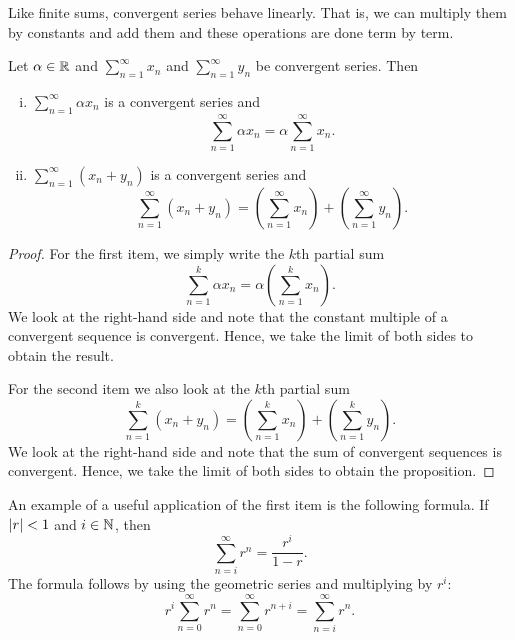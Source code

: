 Like finite sums, convergent series behave linearly.
That is, we can multiply them by constants
and add them and these operations are done term by term.

\begin{prop}
Let $\alpha \in {\mathbb{R}}$ and $\sum_{n=1}^\infty x_n$ and $\sum_{n=1}^\infty y_n$ be
convergent series.  Then
\begin{enumerate}[(i)]
\item
$\sum_{n=1}^\infty \alpha x_n$ is a convergent series and
\begin{equation*}
\sum_{n=1}^\infty \alpha x_n
=
\alpha \sum_{n=1}^\infty x_n .
\end{equation*}
\item
$\sum_{n=1}^\infty ( x_n + y_n )$ is a convergent series and
\begin{equation*}
\sum_{n=1}^\infty ( x_n + y_n ) 
=
\left( \sum_{n=1}^\infty x_n \right)
+
\left( \sum_{n=1}^\infty y_n \right) .
\end{equation*}
\end{enumerate}
\end{prop}

\begin{proof}
For the first item,
we simply write the $k$th partial sum
\begin{equation*}
\sum_{n=1}^k \alpha x_n
=
\alpha \left( \sum_{n=1}^k x_n \right) .
\end{equation*}
We look at the right-hand side and note that the constant multiple of
a convergent sequence
is convergent.  Hence, we take the limit of both sides to obtain
the result.

For the second item we also look at the
$k$th partial sum
\begin{equation*}
\sum_{n=1}^k ( x_n + y_n ) 
=
\left( \sum_{n=1}^k x_n \right)
+
\left( \sum_{n=1}^k y_n \right) .
\end{equation*}
We look at the right-hand side and note that the sum of convergent sequences
is convergent.  Hence, we take the limit of both sides to obtain
the proposition.
\end{proof}

An example of a useful application of the first item is the following
formula.  If $\left\lvert {r} \right\rvert < 1$ and $i \in {\mathbb{N}}$, then
\begin{equation*}
\sum_{n=i}^\infty r^n = \frac{r^i}{1-r} .
\end{equation*}
The formula follows by using the geometric series and multiplying by
$r^i$:
\begin{equation*}
r^i \sum_{n=0}^\infty r^n =
\sum_{n=0}^\infty r^{n+i}
=
\sum_{n=i}^\infty r^n .
\end{equation*}

